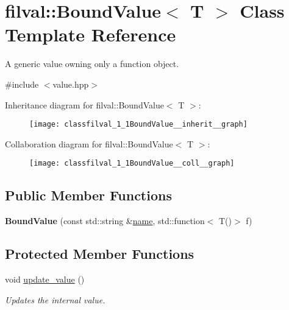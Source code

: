\hypertarget{classfilval_1_1BoundValue}{}\section{filval\+:\+:Bound\+Value$<$ T $>$ Class Template Reference}
\label{classfilval_1_1BoundValue}


A generic value owning only a function object.  




{\ttfamily \#include $<$value.\+hpp$>$}



Inheritance diagram for filval\+:\+:Bound\+Value$<$ T $>$\+:
\nopagebreak
\begin{figure}[H]
\begin{center}
\leavevmode
\texttt{[image: classfilval\_1\_1BoundValue\_\_inherit\_\_graph]}
\end{center}
\end{figure}


Collaboration diagram for filval\+:\+:Bound\+Value$<$ T $>$\+:
\nopagebreak
\begin{figure}[H]
\begin{center}
\leavevmode
\texttt{[image: classfilval\_1\_1BoundValue\_\_coll\_\_graph]}
\end{center}
\end{figure}
\subsection*{Public Member Functions}
\begin{DoxyCompactItemize}
\item 
\hypertarget{classfilval_1_1BoundValue_a83b84653daad6bf91231bbe226d97991}{}\label{classfilval_1_1BoundValue_a83b84653daad6bf91231bbe226d97991} 
{\bfseries Bound\+Value} (const std\+::string \&\hyperlink{classfilval_1_1GenValue_a007e38c03ee041c2a657afa3d6e91ab1}{name}, std\+::function$<$ T()$>$ f)
\end{DoxyCompactItemize}
\subsection*{Protected Member Functions}
\begin{DoxyCompactItemize}
\item 
void \hyperlink{classfilval_1_1BoundValue_a90be966f85204cac57075e4ee66f2fa9}{update\+\_\+value} ()
\begin{DoxyCompactList}\small\item\em Updates the internal value. \end{DoxyCompactList}\end{DoxyCompactItemize}
